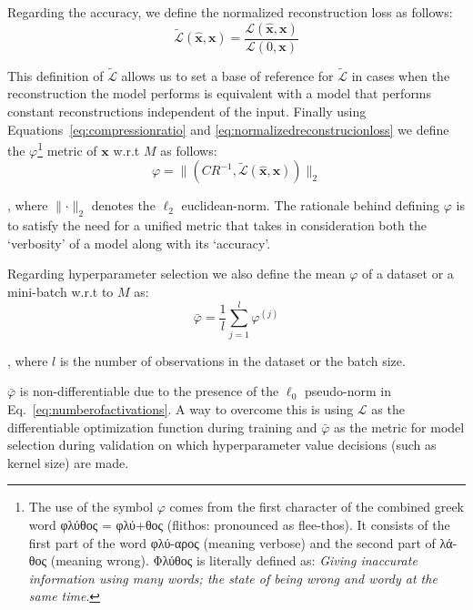 \documentclass[journal]{IEEEtran}
\begin{document}
Regarding the accuracy, we define the normalized reconstruction loss as follows:
\begin{equation}
	\label{eq:normalizedreconstrucionloss}
	\tilde{\mathcal{L}}(\hat{\bm{x}},\bm{x}) = \frac{\mathcal{L}(\hat{\bm{x}},\bm{x})}{\mathcal{L}(0,\bm{x})}
\end{equation}

This definition of $\tilde{\mathcal{L}}$ allows us to set a base of reference for $\tilde{\mathcal{L}}$ in cases when the reconstruction the model performs is equivalent with a model that performs constant reconstructions independent of the input.
Finally using Equations~\ref{eq:compressionratio} and \ref{eq:normalizedreconstrucionloss} we define the $\varphi$\footnote{The use of the symbol $\varphi$ comes from the first character of the combined greek word {\textgreekfont φλύθος} = {\textgreekfont φλύ+θος} (flithos: pronounced as flee-thos). It consists of the first part of the word {\textgreekfont φλύ-αρος} (meaning verbose) and the second part of {\textgreekfont λά-θος} (meaning wrong). {\textgreekfont Φλύθος} is literally defined as: \textit{Giving inaccurate information using many words; the state of being wrong and wordy at the same time}.} metric of $\bm{x}$ w.r.t $M$ as follows:
\begin{equation}
	\label{eq:flithos}
	\varphi = \lVert(CR^{-1}, \tilde{\mathcal{L}}(\hat{\bm{x}},\bm{x}))\rVert_2
\end{equation}

\noindent
, where $\lVert \cdot \rVert_2$ denotes the $\ell_2$ euclidean-norm.
The rationale behind defining $\varphi$ is to satisfy the need for a unified metric that takes in consideration both the `verbosity' of a model along with its `accuracy'.

Regarding hyperparameter selection we also define the mean $\varphi$ of a dataset or a mini-batch w.r.t to $M$ as:
\begin{equation}
	\label{eq:meanflithos}
	\bar\varphi = \frac{1}{l}\sum\limits_{j=1}^l \varphi^{(j)}
\end{equation}

\noindent
, where $l$ is the number of observations in the dataset or the batch size.

$\bar\varphi$ is non-differentiable due to the presence of the $\ell_0$ pseudo-norm in Eq.~\ref{eq:numberofactivations}.
A way to overcome this is using $\mathcal{L}$ as the differentiable optimization function during training and $\bar\varphi$ as the metric for model selection during validation on which hyperparameter value decisions (such as kernel size) are made.
\end{document}
